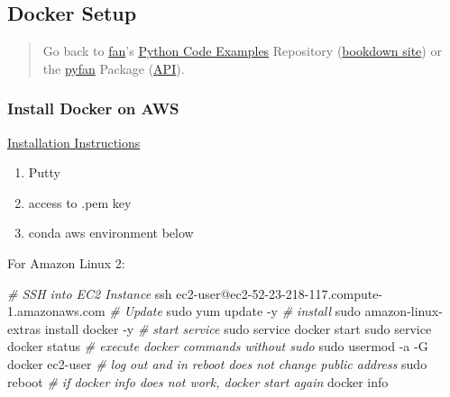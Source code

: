 \documentclass[
]{book}
\newenvironment{Shaded}{\begin{snugshade}}{\end{snugshade}}
\newcommand{\CommentTok}[1]{\textcolor[rgb]{0.56,0.35,0.01}{\textit{#1}}}
\newcommand{\ExtensionTok}[1]{#1}
\newcommand{\FunctionTok}[1]{\textcolor[rgb]{0.00,0.00,0.00}{#1}}
\newcommand{\NormalTok}[1]{#1}
\providecommand{\tightlist}{%
  \setlength{\itemsep}{0pt}\setlength{\parskip}{0pt}}
\begin{document}
\hypertarget{docker-setup-1}{%
\subsection{Docker Setup}\label{docker-setup-1}}

\begin{quote}
Go back to \href{http://fanwangecon.github.io/}{fan}'s \href{https://fanwangecon.github.io/Py4Econ/}{Python Code Examples} Repository (\href{https://fanwangecon.github.io/Py4Econ/bookdown}{bookdown site}) or the \href{https://pyfan.readthedocs.io/en/latest/}{pyfan} Package (\href{https://pyfan.readthedocs.io/en/latest/reference.html}{API}).
\end{quote}

\hypertarget{install-docker-on-aws}{%
\subsubsection{Install Docker on AWS}\label{install-docker-on-aws}}

\href{https://docs.aws.amazon.com/AmazonECS/latest/developerguide/docker-basics.html}{Installation Instructions}

\begin{enumerate}
\def\labelenumi{\arabic{enumi}.}
\tightlist
\item
  Putty
\item
  access to .pem key
\item
  conda aws environment below
\end{enumerate}

For Amazon Linux 2:

\begin{Shaded}
\begin{Highlighting}[]
\CommentTok{\# SSH into EC2 Instance}
\FunctionTok{ssh}\NormalTok{ ec2{-}user@ec2{-}52{-}23{-}218{-}117.compute{-}1.amazonaws.com}
\CommentTok{\# Update}
\FunctionTok{sudo}\NormalTok{ yum update {-}y}
\CommentTok{\# install}
\FunctionTok{sudo}\NormalTok{ amazon{-}linux{-}extras install docker {-}y}
\CommentTok{\# start service}
\FunctionTok{sudo}\NormalTok{ service docker start}
\FunctionTok{sudo}\NormalTok{ service docker status}
\CommentTok{\# execute docker commands without sudo}
\FunctionTok{sudo}\NormalTok{ usermod {-}a {-}G docker ec2{-}user}
\CommentTok{\# log out and in reboot does not change public address}
\FunctionTok{sudo}\NormalTok{ reboot}
\CommentTok{\# if docker info does not work, docker start again}
\ExtensionTok{docker}\NormalTok{ info}
\end{Highlighting}
\end{Shaded}
\end{document}
